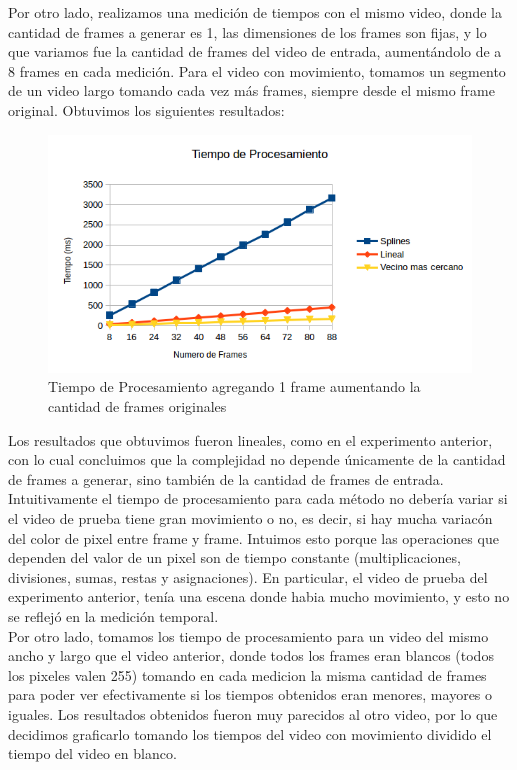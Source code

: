 Por otro lado, realizamos una medición de tiempos con el mismo video, donde la cantidad de frames a generar es 1,   las dimensiones de los frames son fijas, y lo que variamos fue la cantidad de frames del video de entrada, aumentándolo de a 8 frames en cada medición. Para el video con movimiento, tomamos un segmento de un video largo tomando cada vez más frames, siempre desde el mismo frame original. Obtuvimos los siguientes resultados:


\begin{figure}[h!]
  \centering
    \includegraphics[scale= 0.6]{imagenes/aumentandoFramesMessi.png}
  \caption{Tiempo de Procesamiento agregando 1 frame aumentando la cantidad de frames originales}
\end{figure}

Los resultados que obtuvimos fueron lineales, como en el experimento anterior, con lo cual concluimos que la complejidad no depende únicamente de la cantidad de frames a generar, sino también de la cantidad de frames de entrada.\\


Intuitivamente el tiempo de procesamiento para cada método no debería variar si el video de prueba tiene gran movimiento o no, es decir, si hay mucha variacón del color de pixel entre frame y frame. Intuimos esto porque las operaciones que dependen del valor de un pixel son de tiempo constante (multiplicaciones, divisiones, sumas, restas y asignaciones). En particular, el video de prueba del experimento anterior, tenía una escena donde habia mucho movimiento, y esto no se reflejó en la medición temporal. \\

Por otro lado, tomamos los tiempo de procesamiento para un video del mismo ancho y largo que el video anterior, donde todos los frames eran blancos (todos los pixeles valen 255) tomando en cada medicion la misma cantidad de frames para poder ver efectivamente si los tiempos obtenidos eran menores, mayores o iguales. Los resultados obtenidos fueron muy parecidos al otro video, por lo que decidimos graficarlo tomando los tiempos del video con movimiento dividido el tiempo del video en blanco.


